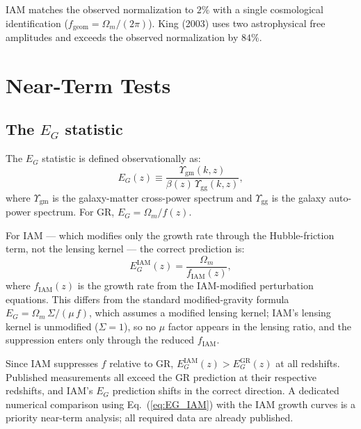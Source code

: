 \documentclass[12pt,a4paper]{article}
\begin{document}
IAM matches the observed normalization to $2\%$ with a single cosmological
identification ($f_\mathrm{geom} = \Omega_m/(2\pi)$). King (2003) uses two
astrophysical free amplitudes and exceeds the observed normalization by $84\%$.

\section{Near-Term Tests}
\label{sec:future}

\subsection{The $E_G$ statistic}
\label{sec:EG}

The $E_G$ statistic \citep{Zhang2007,Reyes2010} is defined observationally as:
\begin{equation}
  E_G(z) \equiv \frac{\Upsilon_\mathrm{gm}(k,z)}{\beta(z)\,\Upsilon_\mathrm{gg}(k,z)},
\end{equation}
where $\Upsilon_\mathrm{gm}$ is the galaxy-matter cross-power spectrum and
$\Upsilon_\mathrm{gg}$ is the galaxy auto-power spectrum. For GR, $E_G = \Omega_m/f(z)$.

For IAM --- which modifies only the growth rate through the Hubble-friction term, not the
lensing kernel --- the correct prediction is:
\begin{equation}
  E_G^\mathrm{IAM}(z) = \frac{\Omega_m}{f_\mathrm{IAM}(z)},
  \label{eq:EG_IAM}
\end{equation}
where $f_\mathrm{IAM}(z)$ is the growth rate from the IAM-modified perturbation
equations. This differs from the standard modified-gravity formula
$E_G = \Omega_m\,\Sigma/(\mu\,f)$, which assumes a modified lensing kernel; IAM's
lensing kernel is unmodified ($\Sigma = 1$), so no $\mu$ factor appears in the lensing
ratio, and the suppression enters only through the reduced $f_\mathrm{IAM}$.

Since IAM suppresses $f$ relative to GR, $E_G^\mathrm{IAM}(z) > E_G^\mathrm{GR}(z)$
at all redshifts. Published measurements \citep{Reyes2010,Alam2017,Singh2019} all
exceed the GR prediction at their respective redshifts, and IAM's $E_G$ prediction
shifts in the correct direction. A dedicated numerical comparison using
Eq.~(\ref{eq:EG_IAM}) with the IAM growth curves is a priority near-term analysis;
all required data are already published.
\end{document}

